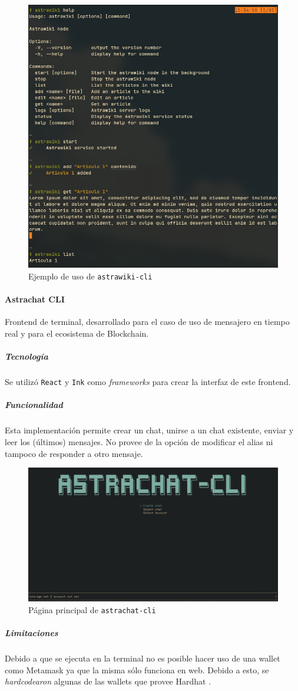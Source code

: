 \begin{figure}[H]
    \centering
    \includegraphics[width=0.7\linewidth]{img/astrawiki-cli.png}
    \caption{Ejemplo de uso de \texttt{astrawiki-cli}}
    \label{fig:astrawiki-cli}
\end{figure}

\paragraph{Astrachat CLI}

Frontend de terminal, desarrollado para el caso de uso de mensajero en tiempo real y para el ecosistema de Blockchain.

\subparagraph{Tecnología}

Se utilizó \texttt{React} \cite{react} y \texttt{Ink} \cite{ink} como \textit{frameworks} para crear la interfaz de este frontend.

\subparagraph{Funcionalidad}

Esta implementación permite crear un chat, unirse a un chat existente, enviar y leer los (últimos) mensajes. No provee de la opción de modificar el alias ni tampoco de responder a otro mensaje.

\begin{figure}[H]
    \centering
    \includegraphics[width=1\linewidth]{img/astrachat-cli-main-page.png}
    \caption{Página principal de \texttt{astrachat-cli}}
    \label{fig:astrachat-cli-main-page}
\end{figure}

\subparagraph{Limitaciones}

Debido a que se ejecuta en la terminal no es posible hacer uso de una wallet como Metamask \cite{metamask} ya que la misma sólo funciona en web. Debido a esto, se \textit{hardcodearon} algunas de las wallets que provee Hardhat \cite{hardhat}.